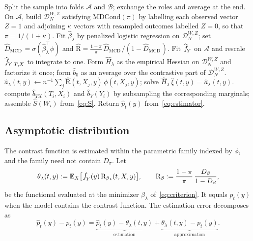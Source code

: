 \documentclass[11pt]{article}
\theoremstyle{plain}
\theoremstyle{definition}
\theoremstyle{remark}
\newcommand{\mcd}{\text{MCD}\,}
\newcommand{\MDC}{\ensuremath{\text{MDCond}}}
\newcommand{\pE}{\ensuremath{\mathbb{E}}}
\newcommand{\pf}[1]{\ensuremath{\,\mathlarger{\textit{f}}_{#1}}}
\newcommand{\pfhat}[1]{\ensuremath{\,\mathlarger{\widehat{\textit{f}}}_{#1}}}
\newcommand{\ratio}{\ensuremath{\pi}}
\newcommand{\contrast}{D_{\ratio}}
\newcommand{\contrasthat}{\widehat{D}_{\mcd}}
\newcommand{\DensityRatio}{\text{R}}
\newcommand{\mDwz}[1]{\ensuremath{\mathcal{D}}_{#1}^{W,Z}}
\newcommand{\betahat}{\widehat{\beta}}
\newcommand{\score}{S}
\begin{document}
\begin{algorithm}[htbp]
\caption{Corrected estimator of $p_t(y)$ with a penalized logistic contrast}
\label{alg:main}
\begin{algorithmic}[1]
\State Split the sample into folds $\mathcal{A}$ and $\mathcal{B}$; exchange the roles and average at the end.
\State On $\mathcal{A}$, build $\mDwz{N}$ satisfying $\MDC(\ratio)$ by labelling each observed vector $Z=1$ and adjoining $\kappa$ vectors with resampled outcomes labelled $Z=0$, so that $\ratio = 1/(1+\kappa)$.
\State Fit $\betahat_\lambda$ by penalized logistic regression on $\mDwz{N}$; set $\contrasthat = \sigma(\betahat_\lambda^\top \phi)$ and $\widehat{\DensityRatio} = \tfrac{1-\ratio}{\ratio}\,\contrasthat/(1-\contrasthat)$.
\State Fit $\pfhat{Y}$ on $\mathcal{A}$ and rescale $\pfhat{Y \mid T,X}$ to integrate to one.
\State Form $\widehat H_\lambda$ as the empirical Hessian on $\mDwz{N}$ and factorize it once; form $\widehat b_0$ as an average over the contrastive part of $\mDwz{N}$.
  \State $\widehat a_\lambda(t,y) \gets n^{-1}\sum_j \widehat{\DensityRatio}(t,X_j,y)\,\phi(t,X_j,y)$;
  \State solve $\widehat H_\lambda\, \widehat\xi(t,y) = \widehat a_\lambda(t,y)$.
\EndFor
{}
  \State compute $\widehat b_{TX}(T_i,X_i)$ and $\widehat b_Y(Y_i)$ by subsampling the corresponding marginals;
  \State assemble $\widehat \score(W_i)$ from~\eqref{eq:S}.
\EndFor
\State Return $\widehat p_t(y)$ from~\eqref{eq:estimator}.
\end{algorithmic}
\end{algorithm}

\subsection{Asymptotic distribution}
\label{sec:mcd-asymptotics}

The contrast function is estimated within the parametric family indexed by $\phi$, and
the family need not contain $\contrast$. Let
\begin{equation}
\theta_\lambda(t,y) := \pE_X\big[ \pf{Y}(y)\,\DensityRatio_{\beta_\lambda}(t,X,y) \big],
\qquad
\DensityRatio_{\beta} := \frac{1-\ratio}{\ratio}\,\frac{D_\beta}{1-D_\beta},
\label{eq:pseudo-true}
\end{equation}
be the functional evaluated at the minimizer $\beta_\lambda$ of~\eqref{eq:criterion}. It
equals $p_t(y)$ when the model contains the contrast function. The estimation error
decomposes as
\begin{equation}
\widehat p_t(y) - p_t(y)
= \underbrace{\widehat p_t(y) - \theta_\lambda(t,y)}_{\text{estimation}}
+ \underbrace{\theta_\lambda(t,y) - p_t(y)}_{\text{approximation}} .
\label{eq:decomposition}
\end{equation}
\end{document}
